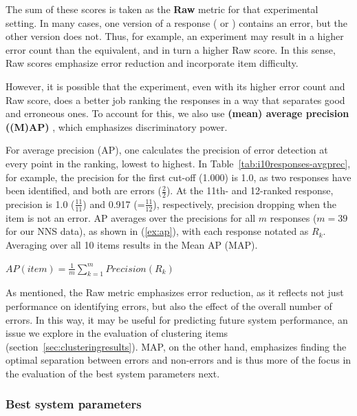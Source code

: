 The sum of these scores is taken as the \textbf{Raw} metric for that
experimental setting. In many cases, one version of a response
( or ) contains an error, but the other
version does not. Thus, for example, an  experiment may
result in a higher error count than the  equivalent, and
in turn a higher Raw score.
In this sense, Raw scores emphasize error reduction and incorporate
item difficulty.

However, it is possible that the  experiment, even with
its higher error count and Raw score, does a better job ranking the
responses in a way that separates good and erroneous ones. To account
for this, we also use \textbf{(mean) average precision ((M)AP)}
\citep[][ch. 8]{manning-et-al:08}, which emphasizes discriminatory
power.

For average precision (AP), one calculates the precision of error
detection at every point in the ranking, lowest to highest.  In
Table~\ref{tab:i10responses-avgprec}, for example, the precision for
the first cut-off (1.000) is 1.0, as two responses have been
identified, and both are errors ($\frac{2}{2}$). At the 11th- and
12-ranked response, precision is 1.0 ($\frac{11}{11}$) and 0.917
(=$\frac{11}{12}$), respectively, precision dropping when the item is
not an error.
AP averages over the precisions for all $m$ responses ($m=39$ for our
NNS data), as shown in (\ref{ex:ap}), with each response notated as
$R_k$.  Averaging over all 10 items results in the Mean AP (MAP).

\begin{exe}
\ex\label{ex:ap} $AP(item) = \frac{1}{m} \sum\limits_{k=1}^m
Precision(R_k)$
\end{exe}

As mentioned, the Raw metric emphasizes error reduction, as it
reflects not just performance on identifying errors, but also the
effect of the overall number of errors.  In this way, it may be useful
for predicting future system performance, an issue we explore in the
evaluation of clustering items (section~\ref{sec:clusteringresults}).
MAP, on the other hand, emphasizes finding the optimal separation
between errors and non-errors and is thus more of the focus in the
evaluation of the best system parameters next.

\subsubsection{Best system parameters} 

